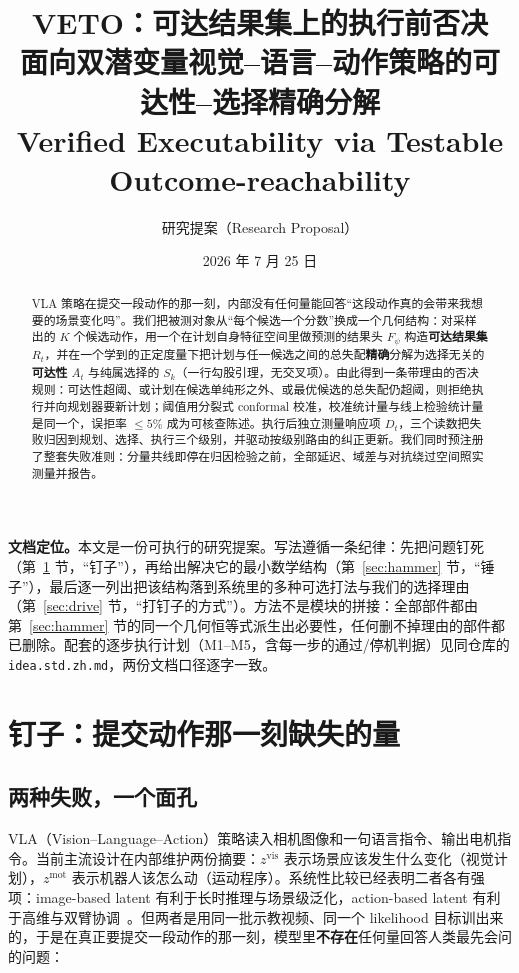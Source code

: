 \documentclass[11pt,a4paper]{ctexart}
\title{\bfseries VETO：可达结果集上的执行前否决\\
\Large 面向双潜变量视觉--语言--动作策略的可达性--选择精确分解\\
\large\mdseries Verified Executability via Testable Outcome-reachability}
\author{研究提案（Research Proposal）}
\date{2026 年 7 月 25 日}
\newcommand{\zvis}{z^{\mathrm{vis}}}
\newcommand{\zmot}{z^{\mathrm{mot}}}
\newcommand{\Rt}{R_t}
\newcommand{\At}{A_t}
\newcommand{\Sk}{S_k}
\newcommand{\Dt}{D_t}
\begin{document}
\maketitle

\begin{tcolorbox}[notebox]
\textbf{文档定位。}本文是一份可执行的研究提案。写法遵循一条纪律：先把问题钉死（第~\ref{sec:nail} 节，``钉子''），再给出解决它的最小数学结构（第~\ref{sec:hammer} 节，``锤子''），最后逐一列出把该结构落到系统里的多种可选打法与我们的选择理由（第~\ref{sec:drive} 节，``打钉子的方式''）。方法不是模块的拼接：全部部件都由第~\ref{sec:hammer} 节的同一个几何恒等式派生出必要性，任何删不掉理由的部件都已删除。配套的逐步执行计划（M1--M5，含每一步的通过/停机判据）见同仓库的 \texttt{idea.std.zh.md}，两份文档口径逐字一致。
\end{tcolorbox}

\begin{abstract}
VLA 策略在提交一段动作的那一刻，内部没有任何量能回答``这段动作真的会带来我想要的场景变化吗''。我们把被测对象从``每个候选一个分数''换成一个几何结构：对采样出的 $K$ 个候选动作，用一个在计划自身特征空间里做预测的结果头 $F_\psi$ 构造\textbf{可达结果集} $\Rt$，并在一个学到的正定度量下把计划与任一候选之间的总失配\textbf{精确}分解为选择无关的\textbf{可达性} $\At$ 与纯属选择的 $\Sk$（一行勾股引理，无交叉项）。由此得到一条带理由的否决规则：可达性超阈、或计划在候选单纯形之外、或最优候选的总失配仍超阈，则拒绝执行并向规划器要新计划；阈值用分裂式 conformal 校准，校准统计量与线上检验统计量是同一个，误拒率 $\le 5\%$ 成为可核查陈述。执行后独立测量响应项 $\Dt$，三个读数把失败归因到规划、选择、执行三个级别，并驱动按级别路由的纠正更新。我们同时预注册了整套失败准则：分量共线即停在归因检验之前，全部延迟、域差与对抗绕过空间照实测量并报告。
\end{abstract}

\tableofcontents
\newpage

\section{钉子：提交动作那一刻缺失的量}\label{sec:nail}

\subsection{两种失败，一个面孔}

VLA（Vision--Language--Action）策略读入相机图像和一句语言指令、输出电机指令。当前主流设计在内部维护两份摘要：$\zvis$ 表示场景应该发生什么变化（视觉计划），$\zmot$ 表示机器人该怎么动（运动程序）。系统性比较已经表明二者各有强项：image-based latent 有利于长时推理与场景级泛化，action-based latent 有利于高维与双臂协调~\cite{pixels2tokens}。但两者是用同一批示教视频、同一个 likelihood 目标训出来的，于是在真正要提交一段动作的那一刻，模型里\textbf{不存在}任何量回答人类最先会问的问题：
\end{document}
